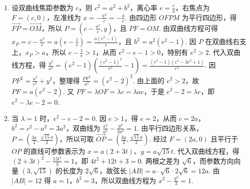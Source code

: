 \begin{solution}
\begin{enumerate}
\item 设双曲线焦距参数为 \(c\)，则 \(c^2=a^2+b^2\)，离心率 \(e=\frac ca\)，右焦点为 \(F=(c,0)\)，左准线为 \(x=-\frac{a^2}{c}=-\frac ae\). 由四边形 \(OFPM\) 为平行四边形，得 \(\overrightarrow{FP}=\overrightarrow{OM}\)，所以 \(P=\left(c-\frac{a^2}{c},y\right)\)，且 \(PF=OM\). 由双曲线方程可得
\(x_P=c-\frac{a^2}{c}=a\left(e-\frac1e\right)=\frac{a(e^2-1)}e\)，且 \(b^2=a^2(e^2-1)\). 因 \(P\) 在双曲线右支上，\(x_P>a\)，所以 \(e-\frac1e>1\)，从而 \(e^2-e-1>0\)，特别有 \(e^2>2\). 代入双曲线方程，得
\(\frac{y^2}{a^2}=(e^2-1)\left(\frac{(e^2-1)^2}{e^2}-1\right)=\frac{(e^2-1)(e^4-3e^2+1)}{e^2}\). 因 \(PF^2=\frac{a^2}{e^2}+y^2\)，整理得 \(\frac{PF^2}{a^2}=(e^2-2)^2\). 由上面的 \(e^2>2\)，故 \(PF=a(e^2-2)\). 又 \(PF=\lambda OF=\lambda c=\lambda ae\)，于是 \(e^2-2=\lambda e\)，即 \(e^2-\lambda e-2=0\).
\item 当 \(\lambda=1\) 时，\(e^2-e-2=0\). 因 \(e>1\)，得 \(e=2\)，从而 \(c=2a\)，\(b^2=c^2-a^2=3a^2\)，双曲线为 \(\frac{x^2}{a^2}-\frac{y^2}{3a^2}=1\). 由平行四边形关系，\(P=\left(\frac{3a}{2},\frac{\sqrt{15}a}{2}\right)\)，所以可取 \(\overrightarrow{OP}=\left(\frac{3a}{2},\frac{\sqrt{15}a}{2}\right)\). 经过 \(F=(2a,0)\) 且平行于 \(OP\) 的直线可参数表示为 \(x=a(2+3t)\)、\(y=a\sqrt{15}t\). 代入双曲线方程，得
\((2+3t)^2-\frac{15t^2}{3}=1\)，即 \(4t^2+12t+3=0\). 两根之差为 \(\sqrt6\)，而参数方向向量 \((3,\sqrt{15})\) 的长度为 \(2\sqrt6\)，故弦长 \(|AB|=a\cdot\sqrt6\cdot2\sqrt6=12a\). 由 \(|AB|=12\) 得 \(a=1\)，\(b^2=3\)，所以双曲线方程为 \(x^2-\frac{y^2}{3}=1\).
\end{enumerate}
\end{solution}
